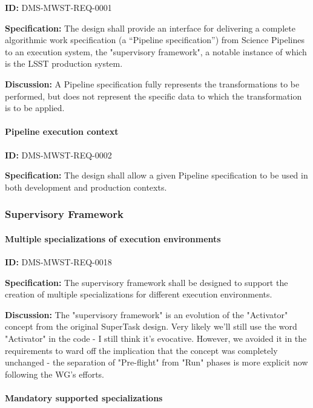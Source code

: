 \documentclass[SE,toc,lsstdraft]{lsstdoc}
\begin{document}
\label{DMS-MWST-REQ-0001}
\textbf{ID:} DMS-MWST-REQ-0001

\textbf{Specification:}
The design shall provide an interface for delivering a complete algorithmic work specification (a “Pipeline specification”) from Science Pipelines to an execution system, the "supervisory framework", a notable instance of which is the LSST production system.

\textbf{Discussion:}
A Pipeline specification fully represents the transformations to be performed, but does not represent the specific data to which the transformation is to be applied.

\paragraph{Pipeline execution context}\hfill  %

\label{DMS-MWST-REQ-0002}
\textbf{ID:} DMS-MWST-REQ-0002

\textbf{Specification:}
The design shall allow a given Pipeline specification to be used in both development and production contexts.

\subsubsection{Supervisory Framework}

\paragraph{Multiple specializations of execution environments}\hfill  %

\label{DMS-MWST-REQ-0018}
\textbf{ID:} DMS-MWST-REQ-0018

\textbf{Specification:}
The supervisory framework shall be designed to support the creation of multiple specializations for different execution environments.

\textbf{Discussion:}
The "supervisory framework" is an evolution of the "Activator" concept from the original SuperTask design. Very likely we'll still use the word "Activator" in the code - I still think it's evocative. However, we avoided it in the requirements to ward off the implication that the concept was completely unchanged - the separation of "Pre-flight" from "Run" phases is more explicit now following the WG's efforts.

\paragraph{Mandatory supported specializations}\hfill  %
\end{document}
